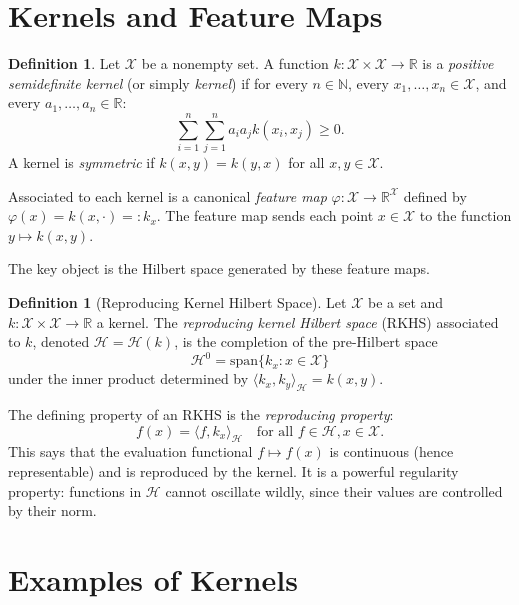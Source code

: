 \documentclass[12pt, oneside]{book}
\theoremstyle{plain}
\theoremstyle{definition}
\newtheorem{definition}[theorem]{Definition}
\newcommand{\R}{\mathbb{R}}
\newcommand{\N}{\mathbb{N}}
\newcommand{\calH}{\mathcal{H}}
\newcommand{\calX}{\mathcal{X}}
\renewcommand{\geq}{\geqslant}
\begin{document}
\section{Kernels and Feature Maps}

\begin{definition}
Let $\calX$ be a nonempty set. A function $k: \calX \times \calX \to \R$ is a \emph{positive semidefinite kernel} (or simply \emph{kernel}) if for every $n \in \N$, every $x_1, \ldots, x_n \in \calX$, and every $a_1, \ldots, a_n \in \R$:
\begin{equation}
\sum_{i=1}^n \sum_{j=1}^n a_i a_j k(x_i, x_j) \geq 0.
\end{equation}
A kernel is \emph{symmetric} if $k(x, y) = k(y, x)$ for all $x, y \in \calX$.
\end{definition}

Associated to each kernel is a canonical \emph{feature map} $\varphi: \calX \to \R^{\calX}$ defined by $\varphi(x) = k(x, \cdot) =: k_x$. The feature map sends each point $x \in \calX$ to the function $y \mapsto k(x,y)$.

The key object is the Hilbert space generated by these feature maps.

\begin{definition}[Reproducing Kernel Hilbert Space]
Let $\calX$ be a set and $k: \calX \times \calX \to \R$ a kernel. The \emph{reproducing kernel Hilbert space} (RKHS) associated to $k$, denoted $\calH = \calH(k)$, is the completion of the pre-Hilbert space
\begin{equation}
\calH^0 = \mathrm{span}\{ k_x : x \in \calX \}
\end{equation}
under the inner product determined by $\langle k_x, k_y \rangle_{\calH} = k(x, y)$.
\end{definition}

The defining property of an RKHS is the \emph{reproducing property}:
\begin{equation}
f(x) = \langle f, k_x \rangle_{\calH} \quad \text{for all } f \in \calH, x \in \calX.
\end{equation}
This says that the evaluation functional $f \mapsto f(x)$ is continuous (hence representable) and is reproduced by the kernel. It is a powerful regularity property: functions in $\calH$ cannot oscillate wildly, since their values are controlled by their norm.

\section{Examples of Kernels}
\end{document}
